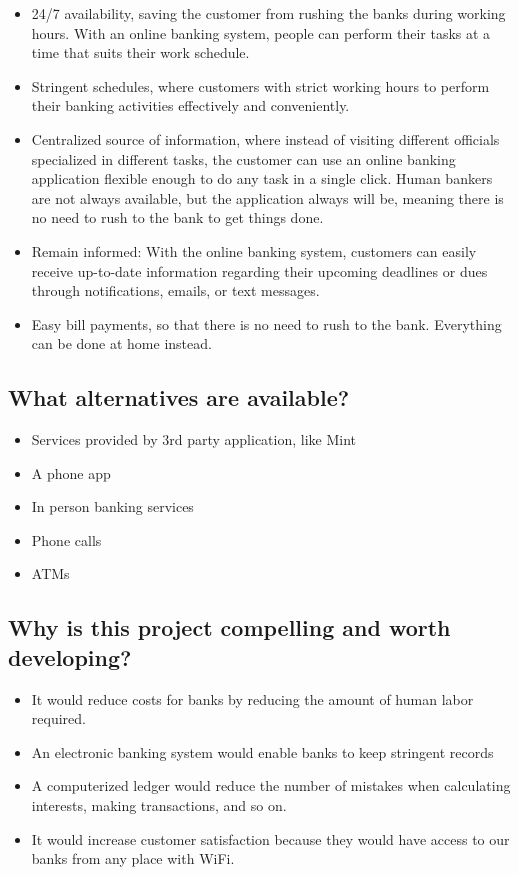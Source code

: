\documentclass[
10pt, %
a4paper, %
oneside, %
headinclude,footinclude, %
BCOR5mm, %
]{scrartcl}
\begin{document}
\begin{itemize}
\item
  24/7 availability, saving the customer from rushing the banks during
  working hours. With an online banking system, people can perform their
  tasks at a time that suits their work schedule.
\item
  Stringent schedules, where customers with strict working hours to
  perform their banking activities effectively and conveniently.
\item
  Centralized source of information, where instead of visiting different
  officials specialized in different tasks, the customer can use an
  online banking application flexible enough to do any task in a single
  click. Human bankers are not always available, but the application
  always will be, meaning there is no need to rush to the bank to get
  things done.
\item
  Remain informed: With the online banking system, customers can easily
  receive up-to-date information regarding their upcoming deadlines or
  dues through notifications, emails, or text messages.
\item
  Easy bill payments, so that there is no need to rush to the bank.
  Everything can be done at home instead.
\end{itemize}

\subsection{What alternatives are
available?}

\begin{itemize}
\item
  Services provided by 3rd party application, like Mint
\item
  A phone app
\item
  In person banking services
\item
  Phone calls
\item
  ATMs
\end{itemize}

\subsection{Why is this project compelling and worth
developing?}

\begin{itemize}
\item
  It would reduce costs for banks by reducing the amount of human labor
  required.
\item
  An electronic banking system would enable banks to keep stringent
  records
\item
  A computerized ledger would reduce the number of mistakes when
  calculating interests, making transactions, and so on.
\item
  It would increase customer satisfaction because they would have
  access to our banks from any place with WiFi.
\end{itemize}
\end{document}
